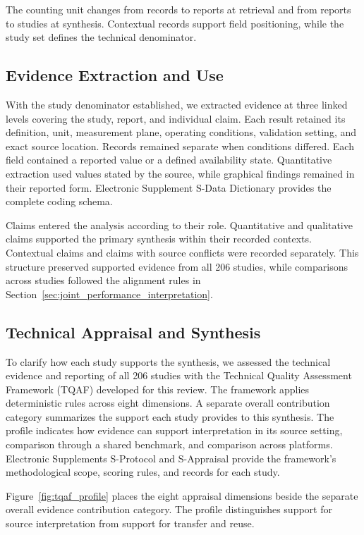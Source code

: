 The counting unit changes from records to reports at retrieval and from reports
to studies at synthesis. Contextual records support field positioning, while
the study set defines the technical denominator.

\subsection{Evidence Extraction and Use}

With the study denominator established, we extracted evidence at three linked
levels covering the study, report, and individual claim. Each result retained
its definition, unit, measurement plane, operating conditions, validation
setting, and exact source location. Records remained separate when conditions
differed. Each field contained a reported value or a defined availability
state.
Quantitative extraction used values stated by the source, while graphical
findings remained in their reported form. Electronic Supplement S-Data
Dictionary provides the complete coding schema.

Claims entered the analysis according to their role. Quantitative and
qualitative claims supported the primary synthesis within their recorded
contexts. Contextual claims and claims with source conflicts were recorded
separately. This structure preserved supported evidence from all 206 studies,
while comparisons across studies followed the alignment rules in
Section~\ref{sec:joint_performance_interpretation}.

\subsection{Technical Appraisal and Synthesis}

To clarify how each study supports the synthesis, we assessed the technical
evidence and reporting of all 206 studies with the Technical Quality Assessment
Framework (TQAF) developed for this review. The framework applies deterministic
rules across eight dimensions. A separate overall contribution category
summarizes the support each study provides to this synthesis. The profile
indicates how evidence can support interpretation in its source setting,
comparison through a shared benchmark, and comparison across platforms.
Electronic Supplements S-Protocol and S-Appraisal provide the framework's
methodological scope, scoring rules, and records for each study.

Figure~\ref{fig:tqaf_profile} places the eight appraisal dimensions beside the
separate overall evidence contribution category. The profile distinguishes
support for source interpretation from support for transfer and reuse.

